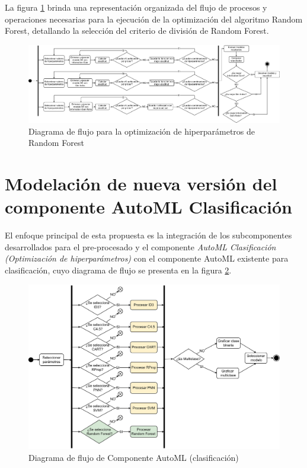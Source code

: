 La figura \ref{fig:optimizacion-randomforest} brinda una representación organizada del flujo de procesos y operaciones necesarias para la ejecución de la optimización del algoritmo Random Forest, detallando la selección del criterio de división de Random Forest.


\begin{figure}[H]
	\centering
	\includegraphics[width=1\linewidth]{"figuras/capi 2/hpo/Optimizacion RandomForest"}
	\caption{Diagrama de flujo para la optimización de hiperparámetros de Random Forest}
	\label{fig:optimizacion-randomforest}
\end{figure}


\section{Modelación de nueva versión del componente AutoML Clasificación}
El enfoque principal de esta propuesta es la integración de los subcomponentes desarrollados para el pre-procesado y el componente \textit{AutoML Clasificación (Optimización de hiperparámetros)} con el componente AutoML existente para clasificación, cuyo diagrama de flujo se presenta en la figura \ref{fig:diagrama-general-componente}. \\

\begin{figure}[H]
	\centering
	\includegraphics[width=0.9\linewidth]{"figuras/capi 2/Diagrama General Componente"}
	\caption{Diagrama de flujo de Componente AutoML (clasificación)}
	\label{fig:diagrama-general-componente}
\end{figure}


